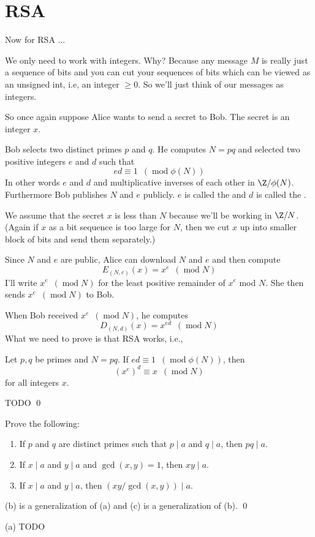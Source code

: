 \section{RSA}

Now for RSA $\ldots$

We only need to work with integers. Why? Because any message $M$ is
really just a sequence of bits and you can cut your sequences of
bits which can be viewed as an unsigned int, i.e, an integer $\geq 0$.
So we'll just think of our messages as integers.

So once again suppose Alice wants to send a secret to Bob. The
secret is an integer $x$.

Bob selects two distinct primes $p$ and $q$.
He computes $N = pq$ and selected two positive integers $e$ and $d$
such that
\[
 ed \equiv 1 \,\,\,(\operatorname{mod} \phi(N))
\]
In other words $e$ and $d$ and multiplicative inverses of each
other in $\Z/\phi(N)$.
Furthermore Bob publishes $N$ and $e$ publicly.
$e$ is called the 
and
$d$ is called the .

We assume that the secret $x$ is less than $N$
because we'll be working in $\Z/N$.
(Again if $x$ as a bit sequence is too large for $N$,
then we cut $x$ up into smaller block of bits and send them
separately.)

Since $N$ and $e$ are public, Alice can download $N$ and $e$
and then compute
\[
E_{(N,e)}(x) = x^e \,\,\,(\operatorname{mod} N)
\]
I'll write $x^e \,\,\,(\operatorname{mod} N)$ for the 
least positive remainder of $x^e$ mod $N$.
She then sends $x^e \,\,\,(\operatorname{mod} N)$ to Bob.

When Bob received $x^e \,\,\,(\operatorname{mod} N)$, he computes
\[
D_{(N,d)}(x) = x^{ed} \,\,\,(\operatorname{mod} N)
\]
What we need to prove is that RSA works, i.e.,


\begin{thm}
  Let $p,q$ be primes and $N = pq$.
  If $ed \equiv 1 \,\,\,(\operatorname{mod} \phi(N))$,
  then
  \[
  (x^e)^d \equiv x \,\,\,(\operatorname{mod} N)
  \]
  for all integers $x$.
\end{thm}

\proof
TODO
\qed

\begin{prop}
  Prove the following:
  \begin{enumerate}[nosep,label=\textnormal{(\alph*)}]
  \item
    If $p$ and $q$ are distinct primes such that $p \mid a$ and $q \mid a$,
    then $pq \mid a$.
  \item 
    If $x \mid a$ and $y \mid a$ and $\gcd(x,y) = 1$, then $xy \mid a$.
  \item
    If $x \mid a$ and $y \mid a$, then $(xy/\gcd(x,y)) \mid a$.
  \end{enumerate}
  (b) is a generalization of (a)
  and (c) is a generalization of (b).
  \qed
\end{prop}
\proof
(a)
TODO

